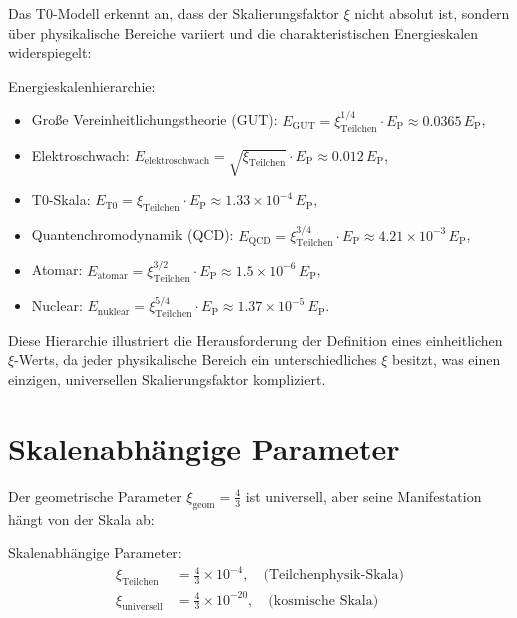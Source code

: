 \documentclass[12pt,a4paper]{report}
\newcommand{\xipar}{\xi}
\newcommand{\xiparticle}{\xi_{\text{Teilchen}}}
\newcommand{\xiuniversal}{\xi_{\text{universell}}}
\newcommand{\xigeom}{\xi_{\text{geom}}}
\newcommand{\EP}{E_{\text{P}}}
\theoremstyle{definition}
\begin{document}
	Das T0-Modell erkennt an, dass der Skalierungsfaktor $\xipar$ nicht absolut ist, sondern über physikalische Bereiche variiert und die charakteristischen Energieskalen widerspiegelt:
	
	\begin{unification}
		Energieskalenhierarchie:
		\begin{itemize}
			\item Große Vereinheitlichungstheorie (GUT): $E_{\text{GUT}} = \xiparticle^{1/4} \cdot \EP \approx 0.0365 \, \EP$,
			\item Elektroschwach: $E_{\text{elektroschwach}} = \sqrt{\xiparticle} \cdot \EP \approx 0.012 \, \EP$,
			\item T0-Skala: $E_{\text{T0}} = \xiparticle \cdot \EP \approx 1.33 \times 10^{-4} \, \EP$,
			\item Quantenchromodynamik (QCD): $E_{\text{QCD}} = \xiparticle^{3/4} \cdot \EP \approx 4.21 \times 10^{-3} \, \EP$,
			\item Atomar: $E_{\text{atomar}} = \xiparticle^{3/2} \cdot \EP \approx 1.5 \times 10^{-6} \, \EP$,
			\item Nuclear: $E_{\text{nuklear}} = \xiparticle^{5/4} \cdot \EP \approx 1.37 \times 10^{-5} \, \EP$.
		\end{itemize}
	\end{unification}
	
	Diese Hierarchie illustriert die Herausforderung der Definition eines einheitlichen $\xipar$-Werts, da jeder physikalische Bereich ein unterschiedliches $\xipar$ besitzt, was einen einzigen, universellen Skalierungsfaktor kompliziert.
	
	\section{Skalenabhängige Parameter}
	\label{sec:skalen_parameter}
	
	Der geometrische Parameter $\xigeom = \frac{4}{3}$ ist universell, aber seine Manifestation hängt von der Skala ab:
	
	\begin{unification}
		Skalenabhängige Parameter:
		\begin{align}
			\xiparticle &= \frac{4}{3} \times 10^{-4}, \quad \text{(Teilchenphysik-Skala)} \\
			\xiuniversal &= \frac{4}{3} \times 10^{-20}, \quad \text{(kosmische Skala)}
		\end{align}
	\end{unification}
	
\end{document}
